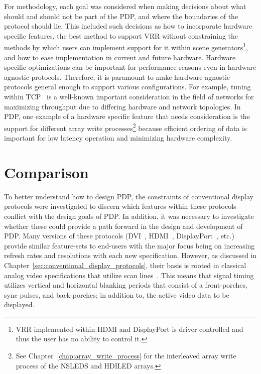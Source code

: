    For methodology, each goal was considered when making decisions about what should and should not be part of the PDP, and where the boundaries of the protocol should lie. This included such decisions as how to incorporate hardware specific features, the best method to support VRR without constraining the methods by which users can implement support for it within scene generators\footnote{VRR implemented within HDMI and DisplayPort is driver controlled and thus the user has no ability to control it.}, and how to ease implementation in current and future hardware. Hardware specific optimizations can be important for performance reasons even in hardware agnostic protocols. Therefore, it is paramount to make hardware agnostic protocols general enough to support various configurations. For example, tuning within TCP~\cite{WeigleFeng2002} is a well-known important consideration in the field of networks for maximizing throughput due to differing hardware and network topologies. In PDP, one example of a hardware specific feature that needs consideration is the support for different array write processes\footnote{See Chapter~\ref{chap:array_write_process} for the interleaved array write process of the NSLEDS and HDILED arrays.} because efficient ordering of data is important for low latency operation and minimizing hardware complexity.

\section{Comparison}

    To better understand how to design PDP, the constraints of conventional display protocols were investigated to discern which features within these protocols conflict with the design goals of PDP. In addition, it was necessary to investigate whether these could provide a path forward in the design and development of PDP. Many versions of these protocols (DVI~\cite{DDWG1999}, HDMI~\cite{HDMIForum2018}, DisplayPort~\cite{VESA2016}, etc.) provide similar feature-sets to end-users with the major focus being on increasing refresh rates and resolutions with each new specification. However, as discussed in Chapter~\ref{sec:conventional_display_protocols}, their basis is rooted in classical analog video specifications that utilize scan lines~\cite{Neal1998}. This means that signal timing utilizes vertical and horizontal blanking periods that consist of a front-porches, sync pulses, and back-porches; in addition to, the active video data to be displayed.

